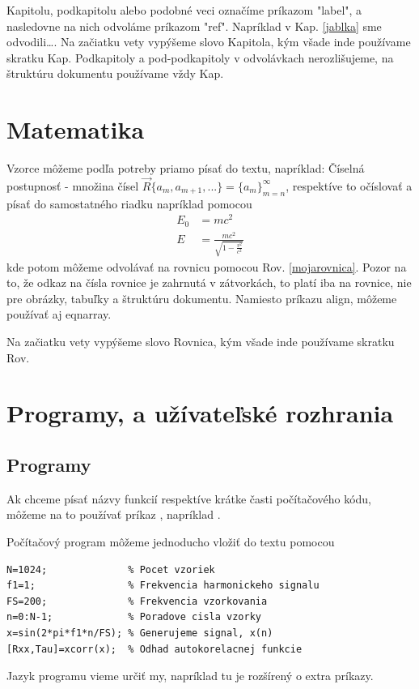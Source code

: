 Kapitolu, podkapitolu alebo podobné veci označíme príkazom "label", a nasledovne na nich odvoláme príkazom "ref". Napríklad v Kap. \ref{jablka} sme odvodili\ldots.
Na začiatku vety vypýšeme slovo Kapitola, kým všade inde používame skratku Kap. Podkapitoly a pod-podkapitoly v odvolávkach nerozlišujeme, na štruktúru dokumentu používame vždy Kap.

\section{Matematika}

Vzorce môžeme podľa potreby priamo písať do textu, napríklad: Číselná postupnosť - množina čísel $\vec{R} \{a_m, a_{m+1}, ...\}
= \{a_m\}_{m = n}^\infty$, respektíve to očíslovať a písať do samostatného riadku napríklad pomocou
  \begin{align}
  \label{mojarovnica}
    E_0 &= mc^2                              \\
    E &= \frac{mc^2}{\sqrt{1-\frac{v^2}{c^2}}}
  \end{align}
kde potom môžeme odvolávať na rovnicu pomocou Rov. \eqref{mojarovnica}. Pozor na to, že odkaz na čísla rovnice je zahrnutá v zátvorkách, to platí iba na rovnice, nie pre obrázky, tabuľky a štruktúru dokumentu. Namiesto príkazu align, môžeme používať aj eqnarray.

Na začiatku vety vypýšeme slovo Rovnica, kým všade inde používame skratku Rov.

\section{Programy, a užívateľské rozhrania}



\subsection{Programy}

Ak chceme písať názvy funkcií respektíve krátke časti počítačového kódu, môžeme na to používať príkaz , napríklad .

Počítačový program môžeme jednoducho vložiť do textu pomocou
\lstset{language=exMatlab}
\begin{lstlisting}
N=1024;              % Pocet vzoriek
f1=1;                % Frekvencia harmonickeho signalu
FS=200;              % Frekvencia vzorkovania
n=0:N-1;             % Poradove cisla vzorky
x=sin(2*pi*f1*n/FS); % Generujeme signal, x(n)
[Rxx,Tau]=xcorr(x);  % Odhad autokorelacnej funkcie
\end{lstlisting}
Jazyk programu vieme určiť my, napríklad  tu je rozšírený o extra príkazy.

